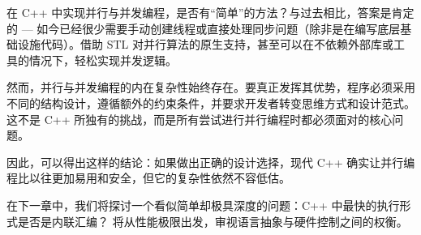 在 C++ 中实现并行与并发编程，是否有“简单”的方法？与过去相比，答案是肯定的 --- 如今已经很少需要手动创建线程或直接处理同步问题（除非是在编写底层基础设施代码）。借助 STL 对并行算法的原生支持，甚至可以在不依赖外部库或工具的情况下，轻松实现并发逻辑。

然而，并行与并发编程的内在复杂性始终存在。要真正发挥其优势，程序必须采用不同的结构设计，遵循额外的约束条件，并要求开发者转变思维方式和设计范式。这不是 C++ 所独有的挑战，而是所有尝试进行并行编程时都必须面对的核心问题。

因此，可以得出这样的结论：如果做出正确的设计选择，现代 C++ 确实让并行编程比以往更加易用和安全，但它的复杂性依然不容低估。

在下一章中，我们将探讨一个看似简单却极具深度的问题：C++ 中最快的执行形式是否是内联汇编？ 将从性能极限出发，审视语言抽象与硬件控制之间的权衡。


